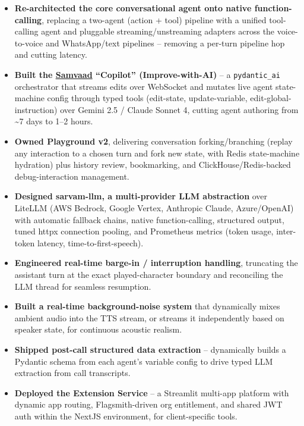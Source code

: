 \documentclass[a4paper,9pt]{extarticle}
\begin{document}
\begin{itemize}[leftmargin=*, labelsep=3pt, itemsep=2pt, topsep=2pt, parsep=0pt]
    \item \textbf{Re-architected the core conversational agent onto native function-calling}, replacing a two-agent (action + tool) pipeline with a unified tool-calling agent and pluggable streaming/unstreaming adapters across the voice-to-voice and WhatsApp/text pipelines -- removing a per-turn pipeline hop and cutting latency.
    \item \textbf{Built the \href{https://www.sarvam.ai/products/conversational-agents}{Samvaad} ``Copilot'' (Improve-with-AI)} -- a \texttt{pydantic\_ai} orchestrator that streams edits over WebSocket and mutates live agent state-machine config through typed tools (edit-state, update-variable, edit-global-instruction) over Gemini 2.5 / Claude Sonnet 4, cutting agent authoring from \textasciitilde7 days to 1--2 hours.
    \item \textbf{Owned Playground v2}, delivering conversation forking/branching (replay any interaction to a chosen turn and fork new state, with Redis state-machine hydration) plus history review, bookmarking, and ClickHouse/Redis-backed debug-interaction management.
    \item \textbf{Designed sarvam-llm, a multi-provider LLM abstraction} over LiteLLM (AWS Bedrock, Google Vertex, Anthropic Claude, Azure/OpenAI) with automatic fallback chains, native function-calling, structured output, tuned httpx connection pooling, and Prometheus metrics (token usage, inter-token latency, time-to-first-speech).
    \item \textbf{Engineered real-time barge-in / interruption handling}, truncating the assistant turn at the exact played-character boundary and reconciling the LLM thread for seamless resumption.
    \item \textbf{Built a real-time background-noise system} that dynamically mixes ambient audio into the TTS stream, or streams it independently based on speaker state, for continuous acoustic realism.
    \item \textbf{Shipped post-call structured data extraction} -- dynamically builds a Pydantic schema from each agent's variable config to drive typed LLM extraction from call transcripts.
    \item \textbf{Deployed the Extension Service} -- a Streamlit multi-app platform with dynamic app routing, Flagsmith-driven org entitlement, and shared JWT auth within the NextJS environment, for client-specific tools.

\end{itemize}
\end{document}
